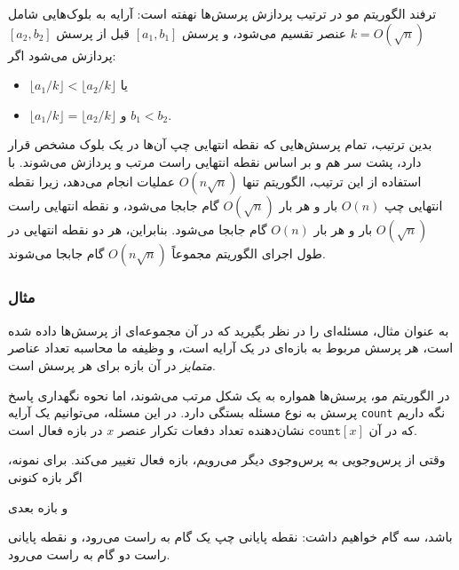 ترفند الگوریتم مو در ترتیب پردازش پرسش‌ها نهفته است:
آرایه به بلوک‌هایی شامل $k=O(\sqrt n)$ عنصر تقسیم می‌شود، و پرسش $[a_1,b_1]$ قبل از پرسش $[a_2,b_2]$ پردازش می‌شود اگر:
\begin{itemize}
\item $\lfloor a_1/k \rfloor < \lfloor a_2/k \rfloor$ یا
\item $\lfloor a_1/k \rfloor = \lfloor a_2/k \rfloor$ و $b_1 < b_2$.
\end{itemize}

بدین ترتیب، تمام پرسش‌هایی که نقطه انتهایی چپ آن‌ها در یک بلوک مشخص قرار دارد، پشت سر هم و بر اساس نقطه انتهایی راست مرتب و پردازش می‌شوند.
با استفاده از این ترتیب، الگوریتم تنها $O(n \sqrt n)$ عملیات انجام می‌دهد، زیرا نقطه انتهایی چپ $O(n)$ بار و هر بار $O(\sqrt n)$ گام جابجا می‌شود، و نقطه انتهایی راست $O(\sqrt n)$ بار و هر بار $O(n)$ گام جابجا می‌شود. بنابراین، هر دو نقطه انتهایی در طول اجرای الگوریتم مجموعاً $O(n \sqrt n)$ گام جابجا می‌شوند.

\subsubsection*{مثال}

به عنوان مثال، مسئله‌ای را در نظر بگیرید که در آن مجموعه‌ای از پرسش‌ها داده شده است، هر پرسش مربوط به بازه‌ای در یک آرایه است، و وظیفه ما محاسبه تعداد عناصر \emph{متمایز} در آن بازه برای هر پرسش است.

در الگوریتم مو، پرسش‌ها همواره به یک شکل مرتب می‌شوند، اما نحوه نگهداری پاسخ پرسش به نوع مسئله بستگی دارد.
در این مسئله، می‌توانیم یک آرایه \texttt{count} نگه داریم که در آن $\texttt{count}[x]$ نشان‌دهنده تعداد دفعات تکرار عنصر $x$ در بازه فعال است.

وقتی از پرس‌وجویی به پرس‌وجوی دیگر می‌رویم،
بازه فعال تغییر می‌کند.
برای نمونه، اگر بازه کنونی
\begin{center}
\end{center}
و بازه بعدی
\begin{center}
\end{center}
باشد، سه گام خواهیم داشت:
نقطه پایانی چپ یک گام به راست می‌رود،
و نقطه پایانی راست دو گام به راست می‌رود.

